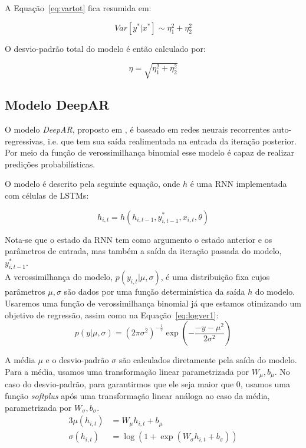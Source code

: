 A Equação~\ref{eq:vartot} fica resumida em:


\[ Var[y^* | x^*] \sim \eta^2_1 + \eta^2_2 \] 

O desvio-padrão total do modelo é então calculado por:

\[
  \eta = \sqrt{\eta^2_1 + \eta^2_2}  
\]


\subsection{Modelo DeepAR}

O modelo \textit{DeepAR}, proposto em \citep{deepar}, é baseado em redes neurais recorrentes auto-regressivas,
i.e. que tem sua saída realimentada na entrada da iteração posterior. Por meio da função de verossimilhança binomial esse modelo é capaz
de realizar predições probabilísticas.

O modelo é descrito pela seguinte equação, onde $h$ é uma RNN implementada com células de LSTMs:

\[
h_{i,t} = h(h_{i,t-1},y^*_{i,t-1},x_{i,t}, \theta)
\]

Nota-se que o estado da RNN tem como argumento o estado anterior e os parâmetros de entrada, mas também a saída da iteração passada do modelo, $y^*_{i,t-1}$. \\

A verossimilhança do modelo, $p(y_{i,t} | \mu,\sigma)$, é uma distribuição fixa
cujos parâmetros $\mu, \sigma$ são dados por uma função determinística da saída $h$ do modelo. Usaremos uma função de verossimilhança binomial já que estamos otimizando um objetivo de regressão, assim como na Equação~\ref{eq:logver1}:
\[
  p(y | \mu,\sigma) = {(2\pi\sigma^2)}^{-\frac{1}{2}} \exp(-  \frac{-y - \mu^2}{2\sigma^2})  
\]

A média $\mu$ e o desvio-padrão $\sigma$ são calculados diretamente pela saída do modelo. Para a média, usamos uma transformação linear parametrizada por $W_{\mu},b_{\mu}$. No caso do desvio-padrão, para garantirmos que ele seja maior que 0, usamos uma função \textit{softplus} após uma transformação linear análoga ao caso da média, parametrizada por  $W_{\sigma},b_{\sigma}$.\\

\begin{alignat}{3}
  \mu(h_{i,t}) &= W_{\mu}h_{i,t} + b_{\mu} \\ 
  \sigma(h_{i,t}) &= \log(1 + \exp(W_{\sigma}h_{i,t}+ b_{\sigma}))
\end{alignat}


